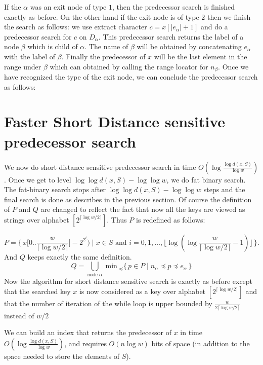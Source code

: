 \documentclass[11pt]{llncs}
\begin{document}
If the $\alpha$ was an exit node of type $1$, then the predecessor search is finished exactly as before. On the other hand if the exit node is of type $2$ then we finish the search as follows: we use extract character $c=x[|e_\alpha|+1]$ and do a predecessor search for $c$ on $D_\alpha$. This predecessor search returns the label of a node $\beta$ which is child of $\alpha$. The name of $\beta$ will be obtained by concatenating $e_\alpha$ with the label of $\beta$. Finally the predecessor of $x$ will be the last element in the range under $\beta$ which can obtained by calling the range locator for $n_\beta$. 
Once we have recognized the type of the exit node, we can conclude the predecessor search as follows:
\section{Faster Short Distance sensitive predecessor search}
We now do short distance sensitive predecessor search in time $O(\log\frac{\log d(x,S)}{\log w})$. Once we get to level $\log\log d(x,S)-\log\log w$, we do fat binary search. The fat-binary search stops after $\log\log d(x,S)-\log\log w$ steps and the final search is done as describes in the previous section. Of course the definition of $P$ and $Q$ are changed to reflect the fact that now all the keys are viewed as strings over alphabet $[2^{\lceil\log w/2\rceil}]$. Thus $P$ is redefined as follows:

\[
	P=\bigl\{\,x\bigl[0..\frac{w}{\lceil\log w/2\rceil}]-2^{2^i}\bigr) \mid x \in  S \text{ and }
	i=0,1,\dots,\lfloor\log(\log \frac{w}{\lceil\log w/2\rceil} - 1)\rfloor\,\bigr\}.
\]
And $Q$ keeps exactly the same definition. 
\[
Q=\bigcup_{\text{node $\alpha$}}\min{}_\preceq\{\,p\in P\mid n_\alpha\preceq p\preceq e_\alpha\,\}
\]
Now the algorithm for short distance sensitive search is exactly as before except that the searched key $x$ is now considered as a key over alphabet $[2^{\lceil\log w/2\rceil}]$ and that the number of iteration of the while loop is upper bounded by $\frac{w}{2\lceil\log w/2\rceil}$ instead of $w/2$
\begin{theorem}
\label{thm:pred-short}
We can build an index that returns the predecessor of $x$
in time $O(\log\frac{\log d(x,S)}{\log w})$, and requires $O(n \log w )$
bits of space (in addition to the space needed to store the elements of $S$).
\end{theorem}


\end{document}
